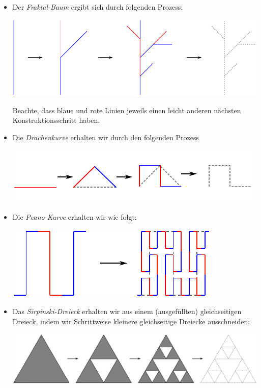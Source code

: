 \documentclass[a4paper,ngerman,12pt]{scrartcl}
\theoremstyle{definition}
\theoremstyle{plain}
\theoremstyle{remark}
\begin{document}
\begin{itemize}
	\item Der \emph{Fraktal-Baum} ergibt sich durch folgenden Prozess:
		\begin{center}
			\includegraphics[width=.7\textwidth]{Bilder/Baum-Konstruktion.pdf}
		\end{center}
		Beachte, dass blaue und rote Linien jeweils einen leicht anderen nächsten Konstruktionsschritt haben.
		
	\item Die \emph{Drachenkurve} erhalten wir durch den folgenden Prozess
		\begin{center}
			\includegraphics[width=.7\textwidth]{Bilder/Drachenkurve_Konstruktion.pdf}
		\end{center}
	
	\item Die \emph{Peano-Kurve} erhalten wir wie folgt:
		\begin{center}
			\includegraphics[width=.5\textwidth]{Bilder/Peano-Konstruktion.pdf}
		\end{center}
	
	\item Das \emph{Sirpinski-Dreieck} erhalten wir aus einem (ausgefüllten) gleichseitigen Dreieck, indem wir Schrittweise kleinere gleichseitige Dreiecke ausschneiden:
		\begin{center}
			\includegraphics[width=.7\textwidth]{Bilder/Sierpinski-Konstruktion.pdf}
		\end{center}
	

\end{itemize}
\end{document}
